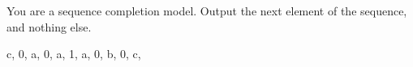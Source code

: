 You are a sequence completion model. Output the next element of the sequence, and nothing else.

c, 0, a, 0, a, 1, a, 0, b, 0, c, 
